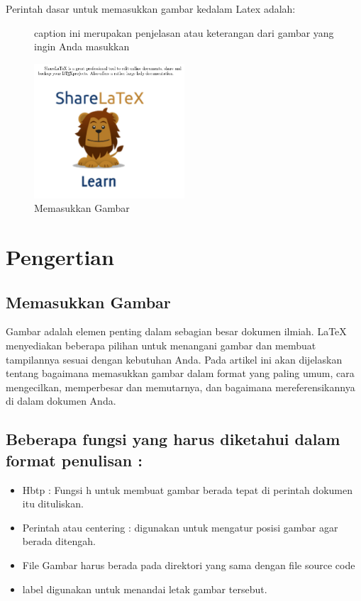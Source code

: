 Perintah dasar untuk memasukkan gambar kedalam Latex adalah:
\begin{figure}[ht]
\caption {caption ini merupakan penjelasan atau keterangan dari gambar yang ingin Anda masukkan}
\label{labelgambar}
\end{figure}


\begin{figure}[ht]
	\centerline{\includegraphics[width=0.50\textwidth]{gambar/dapi13.jpg}}
	\caption{Memasukkan Gambar}
	\label{Memasukkan Gambar}
\end{figure}

\section {Pengertian }
\subsection {Memasukkan Gambar}
{\fontsize{10pt}{10pt}\selectfont  \hspace*{0.64in} Gambar adalah elemen penting dalam sebagian besar dokumen ilmiah. LaTeX menyediakan beberapa pilihan untuk menangani gambar dan membuat tampilannya sesuai dengan kebutuhan Anda. Pada artikel ini akan dijelaskan tentang  bagaimana memasukkan gambar dalam format yang paling umum, cara mengecilkan, memperbesar dan memutarnya, dan bagaimana mereferensikannya di dalam dokumen Anda.} \par

\subsection {Beberapa fungsi yang harus diketahui dalam format penulisan :}
\begin{itemize}
\item Hbtp : Fungsi h untuk membuat gambar berada tepat di perintah dokumen itu dituliskan. 
\item Perintah atau centering : digunakan untuk mengatur posisi gambar agar berada ditengah.
\item File Gambar harus berada pada direktori yang sama dengan file source code
\item label digunakan untuk menandai letak gambar tersebut.
\end{itemize}

